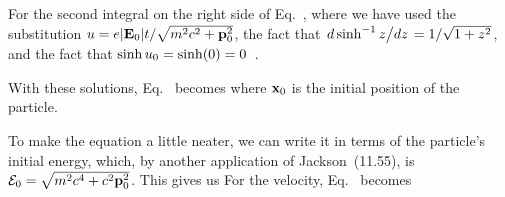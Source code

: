 {	For the second integral on the right side of Eq.~,
	where we have used the substitution $u = e \abs{\vb{E}_0} t / \sqrt{m^2 c^2 + \vb{p}_0^2}$, the fact that $\dv*{\sinh^{-1} z}{z} = 1 / \sqrt{1 + z^2}$, and the fact that $\sinh u_0 = \sinh(0) = 0$~\cite{Arcsinh}.
	
	With these solutions, Eq.~ becomes
	where $\vb{x}_0$ is the initial position of the particle.
	
	To make the equation a little neater, we can write it in terms of the particle's initial energy, which, by another application of Jackson~(11.55), is $\mathcal{E}_0 = \sqrt{m^2 c^4 + c^2 \vb{p}_0^2}$.  This gives us
	For the velocity, Eq.~ becomes
	\vfix
}

%
%


